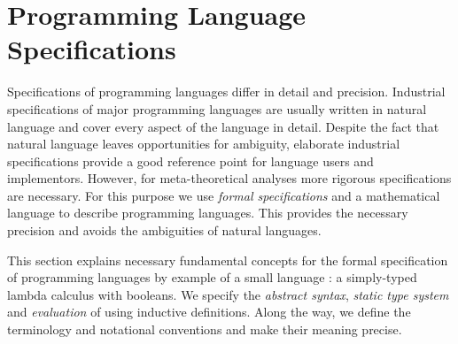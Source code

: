 {%
\section{Programming Language Specifications}\label{sec:intro:specification}


Specifications of programming languages differ in detail and precision.
Industrial specifications of major programming languages are usually written in
natural language and cover every aspect of the language in detail. Despite
the fact that natural language leaves opportunities for ambiguity, elaborate
industrial specifications provide a good reference point for language users and
implementors. However, for meta-theoretical analyses more rigorous
specifications are necessary.
For this purpose we use \emph{formal specifications} and a mathematical language to
describe programming languages. This provides the necessary precision and
avoids the ambiguities of natural languages. 

This section explains necessary
fundamental concepts for the formal specification of programming languages by
example of a small language \stlcbool: a simply-typed lambda calculus with
booleans. We specify the \emph{abstract syntax}, \emph{static type system} and
\emph{evaluation} of \stlcbool using inductive definitions. Along the way, we
define the terminology and notational conventions and make their meaning
precise.

}
